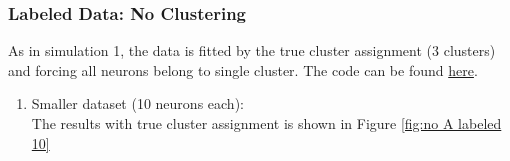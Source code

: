 \documentclass[]{article}
\begin{document}
\subsubsection{Labeled Data: No Clustering}
As in simulation 1, the data is fitted by the true cluster assignment (3 clusters) and forcing all neurons belong to single cluster. The code can be found \href{https://github.com/weigcdsb/state-space-clustering/blob/main/LDS/unspecifiedA_sample.m}{here}.
\begin{enumerate}
	\def\labelenumi{(\arabic{enumi})}
	\item
	Smaller dataset (10 neurons each):\\
	The results with true cluster assignment is shown in Figure \ref{fig:no A labeled 10}
	\begin{figure}[h!]
\end{figure}
\end{enumerate}
\end{document}
